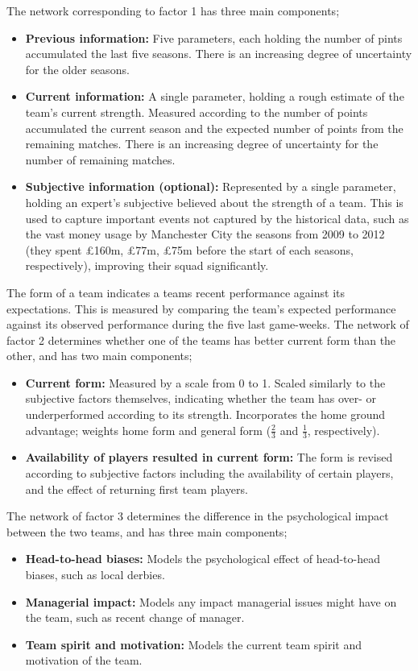 The network corresponding to factor 1 has three main components;
\begin{itemize}
    \item \textbf{Previous information:} Five parameters, each holding the number of pints accumulated the last five seasons. There is an increasing degree of uncertainty for the older seasons.
    \item \textbf{Current information:} A single parameter, holding a rough estimate of the team's current strength. Measured according to the number of points accumulated the current season and the expected number of points from the remaining matches. There is an increasing degree of uncertainty for the number of remaining matches.
    \item \textbf{Subjective information (optional):} Represented by a single parameter, holding an expert's subjective believed about the strength of a team. This is used to capture important events not captured by the historical data, such as the vast money usage by Manchester City the seasons from 2009 to 2012 (they spent £160m, £77m, £75m before the start of each seasons, respectively), improving their squad significantly.
\end{itemize}

The form of a team indicates a teams recent performance against its expectations. This is measured by comparing the team's expected performance against its observed performance during the five last game-weeks. The network of factor 2 determines whether one of the teams has better current form than the other, and has two main components;
\begin{itemize}
    \item \textbf{Current form:} Measured by a scale from 0 to 1. Scaled similarly to the subjective factors themselves, indicating whether the team has over- or underperformed according to its strength. Incorporates the home ground advantage; weights home form and general form ($\frac{2}{3}$ and $\frac{1}{3}$, respectively).
    \item \textbf{Availability of players resulted in current form:} The form is revised according to subjective factors including the availability of certain players, and the effect of returning first team players.
\end{itemize}

The network of factor 3 determines the difference in the psychological impact between the two teams, and has three main components;
\begin{itemize}
    \item \textbf{Head-to-head biases:} Models the psychological effect of head-to-head biases, such as local derbies.
    \item \textbf{Managerial impact:} Models any impact managerial issues might have on the team, such as recent change of manager.
    \item \textbf{Team spirit and motivation:} Models the current team spirit and motivation of the team.
\end{itemize}

